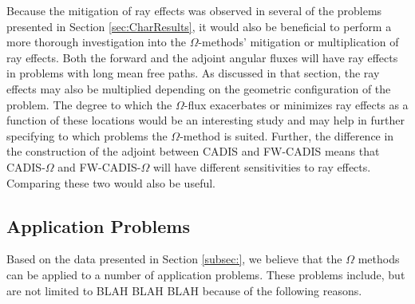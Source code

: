 Because the mitigation of ray effects was observed in several of the problems
presented in Section \ref{sec:CharResults}, it would also be beneficial to
perform a more thorough investigation into the $\Omega$-methods' mitigation or
multiplication of ray effects. Both the forward and the adjoint angular fluxes
will have ray effects in problems with long mean free paths. As discussed in
that section, the ray effects may also be multiplied depending on the geometric
configuration of the problem. The degree to which the $\Omega$-flux exacerbates
or minimizes ray effects as a function of these locations would be an
interesting study and may help in further specifying to which problems the
$\Omega$-method is suited. Further, the difference in the construction of the
adjoint between CADIS and FW-CADIS means that CADIS-$\Omega$ and
FW-CADIS-$\Omega$ will have different sensitivities to ray effects. Comparing
these two would also be useful.

\subsection{Application Problems}
\label{subsec:appprobs}

Based on the data presented in Section \ref{subsec:}, we believe that the
$\Omega$ methods can be applied to a number of application problems. These
problems include, but are not limited to BLAH BLAH BLAH because of the following reasons.

